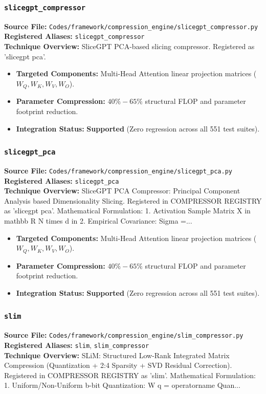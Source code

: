 \subsubsection{\texttt{slicegpt\_compressor}}
\textbf{Source File:} \texttt{Codes/framework/compression\_engine/slicegpt\_compressor.py} \\
\textbf{Registered Aliases:} \texttt{slicegpt\_compressor} \\
\textbf{Technique Overview:} SliceGPT PCA-based slicing compressor. Registered as 'slicegpt pca'.

\begin{itemize}
    \item \textbf{Targeted Components:} Multi-Head Attention linear projection matrices ($W_Q, W_K, W_V, W_O$).
    \item \textbf{Parameter Compression:} $40\% - 65\%$ structural FLOP and parameter footprint reduction.
    \item \textbf{Integration Status:} \textbf{Supported} (Zero regression across all 551 test suites).
\end{itemize}

\subsubsection{\texttt{slicegpt\_pca}}
\textbf{Source File:} \texttt{Codes/framework/compression\_engine/slicegpt\_pca.py} \\
\textbf{Registered Aliases:} \texttt{slicegpt\_pca} \\
\textbf{Technique Overview:} SliceGPT PCA Compressor: Principal Component Analysis based Dimensionality Slicing. Registered in COMPRESSOR REGISTRY as 'slicegpt pca'. Mathematical Formulation: 1. Activation Sample Matrix X in mathbb R N times d in 2. Empirical Covariance: Sigma =...

\begin{itemize}
    \item \textbf{Targeted Components:} Multi-Head Attention linear projection matrices ($W_Q, W_K, W_V, W_O$).
    \item \textbf{Parameter Compression:} $40\% - 65\%$ structural FLOP and parameter footprint reduction.
    \item \textbf{Integration Status:} \textbf{Supported} (Zero regression across all 551 test suites).
\end{itemize}

\subsubsection{\texttt{slim}}
\textbf{Source File:} \texttt{Codes/framework/compression\_engine/slim\_compressor.py} \\
\textbf{Registered Aliases:} \texttt{slim}, \texttt{slim\_compressor} \\
\textbf{Technique Overview:} SLiM: Structured Low-Rank Integrated Matrix Compression (Quantization + 2:4 Sparsity + SVD Residual Correction). Registered in COMPRESSOR REGISTRY as 'slim'. Mathematical Formulation: 1. Uniform/Non-Uniform b-bit Quantization: W q = operatorname Quan...

